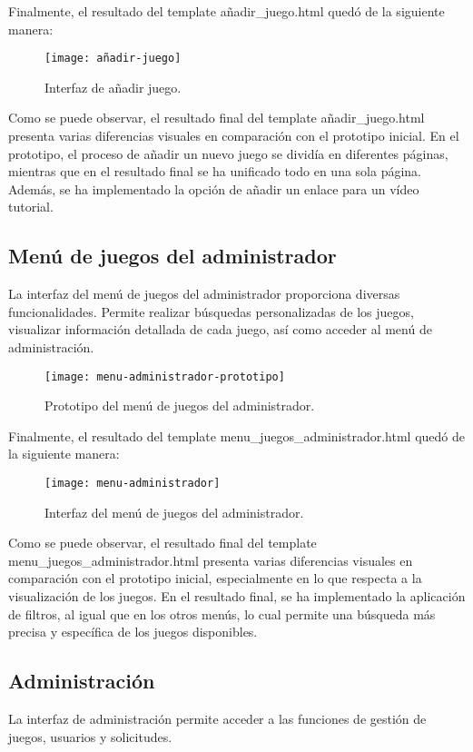 Finalmente, el resultado del template añadir\_juego.html quedó de la siguiente manera:

\begin{figure}[htb]
    \centering
    \texttt{[image: añadir-juego]}
    \caption{Interfaz de añadir juego.}
    \label{fig:añadir-juego}
    \end{figure}

Como se puede observar, el resultado final del template añadir\_juego.html presenta varias diferencias visuales en comparación con el prototipo inicial. En el prototipo, el proceso de añadir un nuevo juego se dividía en diferentes páginas, mientras que en el resultado final se ha unificado todo en una sola página. Además, se ha implementado la opción de añadir un enlace para un vídeo tutorial.

\subsection{Menú de juegos del administrador}
La interfaz del menú de juegos del administrador proporciona diversas funcionalidades. Permite realizar búsquedas personalizadas de los juegos, visualizar información detallada de cada juego, así como acceder al menú de administración.
\newpage

\begin{figure}[htb]
\centering
\texttt{[image: menu-administrador-prototipo]}
\caption{Prototipo del menú de juegos del administrador.}
\label{fig:menu-administrador-prototipo}
\end{figure}

Finalmente, el resultado del template menu\_juegos\_administrador.html quedó de la siguiente manera:

\begin{figure}[htb]
\centering
\texttt{[image: menu-administrador]}
\caption{Interfaz del menú de juegos del administrador.}
\label{fig:menu-administrador}
\end{figure}

Como se puede observar, el resultado final del template menu\_juegos\_administrador.html presenta varias diferencias visuales en comparación con el prototipo inicial, especialmente en lo que respecta a la visualización de los juegos. En el resultado final, se ha implementado la aplicación de filtros, al igual que en los otros menús, lo cual permite una búsqueda más precisa y específica de los juegos disponibles.

\subsection{Administración}
La interfaz de administración permite acceder a las funciones de gestión de juegos, usuarios y solicitudes.

